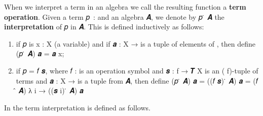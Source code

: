 \ccpad
When we interpret a term in an algebra we call the resulting function a \textbf{term operation}. Given a term \ab 𝑝\ \as :  and an algebra \ab 𝑨, we denote by \ab 𝑝 \af ̇ \ab 𝑨 the \textbf{interpretation} of \ab 𝑝 in \ab 𝑨.
This is defined inductively as follows:
\begin{enumerate}
\def\labelenumi{\arabic{enumi}.}
\tightlist
\item
  if \ab 𝑝 is \ab x \as : \ab X (a variable) and if \ab 𝒂 \as : \ab X \as →  is a tuple of elements of
  , then define (\ab 𝑝 \af ̇ \ab 𝑨) \ab 𝒂 = \ab 𝒂 \ab x;
\item
  if \ab 𝑝 \as = \ab 𝑓 \ab 𝒔, where \ab 𝑓 \as :  is an operation symbol and  \ab 𝒔 \as :  \ab f \as → \af 𝑻 \ab X is an ( \ab f)-tuple of terms and \ab 𝒂 \as : \ab X \as →  is a tuple from \ab 𝑨, then define (\ab 𝑝 \af ̇ \ab 𝑨) \ab 𝒂 = ((\ab 𝑓 \ab 𝒔) \af ̇ \ab 𝑨) \ab 𝒂 = (\ab 𝑓 \af ̂ \ab 𝑨) \as λ \ab i \as → ((\ab 𝒔 \ab i) \af ̇ \ab 𝑨) \ab 𝒂
\end{enumerate}
In the \agdaualib term interpretation is defined as follows.
\ccpad

